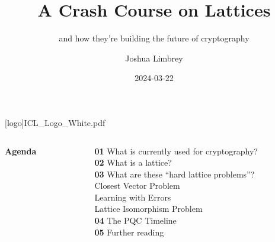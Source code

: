 \documentclass[
aspectratio=169, %
t, %
onlytextwidth, %
10pt, %
]{beamer}
\title{A Crash Course on Lattices} %
\subtitle{and how they're building the future of cryptography} %
\author{Joshua Limbrey} %
\date{2024-03-22} %
\begin{document}




\begingroup
{} %
[logo]{ICL_Logo_White.pdf} %
\frame[plain, s]{\titlepage} %
\endgroup



\begingroup
{} %

\begin{frame}
    \begin{columns}[T] %
        \begin{column}{0.48\linewidth} %
            \HUGE\textbf{Agenda}
        \end{column}
        \begin{column}{0.48\linewidth} %
            \textbf{01} What is currently used for cryptography?\\ %
            \textbf{02} What is a lattice?\\
            \textbf{03} What are these ``hard lattice problems''?\\
            \textbf{   } Closest Vector Problem\\
            \textbf{   } Learning with Errors\\
            \textbf{   } Lattice Isomorphism Problem\\
            \textbf{04} The PQC Timeline\\
            \textbf{05} Further reading
        \end{column}
    \end{columns}
\end{frame}
\endgroup
\end{document}
